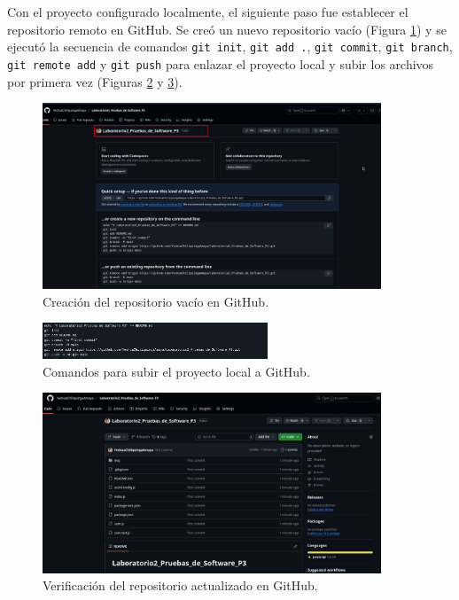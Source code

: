 \documentclass[12pt, a4paper]{article}
\begin{document}
Con el proyecto configurado localmente, el siguiente paso fue establecer el repositorio remoto en GitHub. Se cre\'o un nuevo repositorio vac\'io (Figura \ref{fig:repo_vacio}) y se ejecut\'o la secuencia de comandos \texttt{git init}, \texttt{git add .}, \texttt{git commit}, \texttt{git branch}, \texttt{git remote add} y \texttt{git push} para enlazar el proyecto local y subir los archivos por primera vez (Figuras \ref{fig:git_push} y \ref{fig:repo_actualizado}).

\begin{figure}[H]
    \centering
    \includegraphics[width=0.9\textwidth]{img/creamos repositorio en github vacio.png}
    \caption{Creaci\'on del repositorio vac\'io en GitHub.}
    \label{fig:repo_vacio}
\end{figure}

\begin{figure}[H]
    \centering
    \includegraphics[width=0.6\textwidth]{img/pasos necesrios para poder guardar los archivos locales dentro de github desde echo init add commit branch remoteadd push.png}
    \caption{Comandos para subir el proyecto local a GitHub.}
    \label{fig:git_push}
\end{figure}

\begin{figure}[H]
    \centering
    \includegraphics[width=0.9\textwidth]{img/si hicimos correctamete ya veriamos el repo de github actualizado.png}
    \caption{Verificaci\'on del repositorio actualizado en GitHub.}
    \label{fig:repo_actualizado}
\end{figure}
\end{document}
